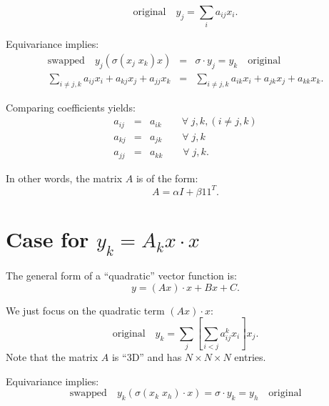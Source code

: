 \begin{equation}
\boxed{\mbox{original}} \quad y_j = \sum_i a_{ij} x_i .
\end{equation}

Equivariance implies:
\begin{eqnarray}
\boxed{\mbox{swapped}} \quad y_j ( \sigma(x_j \; x_k) x) &=& \sigma \cdot y_j = y_k \quad \boxed{\mbox{original}} \\
\sum_{i \neq j,k} a_{ij} x_i + a_{kj} x_j + a_{jj} x_k &=& \sum_{i \neq j,k} a_{ik} x_i + a_{jk} x_j + a_{kk} x_k . \nonumber
\end{eqnarray}


Comparing coefficients yields:
\begin{eqnarray}
a_{ij} &=& a_{ik} \quad \quad \forall \; j, k, (i \neq j, k) \nonumber \\
a_{kj} &=& a_{jk} \quad \quad \forall \; j, k \nonumber \\
a_{jj} &=& a_{kk} \quad \quad \forall \; j, k .
\end{eqnarray}

In other words, the matrix $A$ is of the form:
\begin{equation}
A = \alpha I + \beta 1 1^T .
\end{equation}

\section{Case for $y_k = A_k x \cdot x$}

The general form of a ``quadratic'' vector function is:
\begin{equation}
y = (A x) \cdot x + B x + C .
\end{equation}

We just focus on the quadratic term $(A x) \cdot x$:
\begin{equation}
\boxed{\mbox{original}} \quad y_k = \sum_j \left[ \sum_{i < j} a_{ij}^k x_i \right] x_j .
\end{equation}
Note that the matrix $A$ is ``3D'' and has $N \times N \times N$ entries.

Equivariance implies:
\begin{equation}
\boxed{\mbox{swapped}} \quad y_k ( \sigma(x_k \; x_h) \cdot x) = \sigma \cdot y_k = y_h \quad \boxed{\mbox{original}}
\end{equation}

